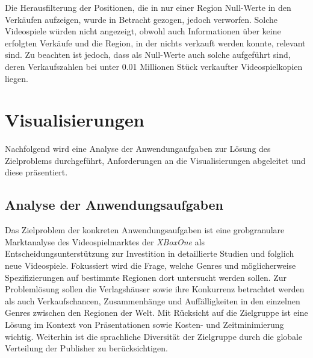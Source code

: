 \documentclass[usegeometry=true]{scrartcl}
\begin{document}
Die Herausfilterung der Positionen, die in nur einer Region Null-Werte in den Verkäufen aufzeigen, wurde in Betracht gezogen, jedoch verworfen.
Solche Videospiele würden nicht angezeigt, obwohl auch Informationen über keine erfolgten Verkäufe und die Region, in der nichts verkauft werden konnte, relevant sind. 
Zu beachten ist jedoch, dass als Null-Werte auch solche aufgeführt sind, deren Verkaufszahlen bei unter 0.01 Millionen Stück verkaufter Videospielkopien liegen. 

\section{Visualisierungen}
Nachfolgend wird eine Analyse der Anwendungaufgaben zur Lösung des Zielproblems durchgeführt, Anforderungen an die Visualisierungen abgeleitet und diese präsentiert.

\subsection{Analyse der Anwendungsaufgaben}
Das Zielproblem der konkreten Anwendungsaufgaben ist eine grobgranulare Marktanalyse des Videospielmarktes der \textit{XBoxOne} 
als Entscheidungsunterstützung zur Investition in detaillierte Studien und folglich neue Videospiele. 
Fokussiert wird die Frage, welche Genres und möglicherweise Spezifizierungen auf bestimmte Regionen dort untersucht werden sollen. 
Zur Problemlösung sollen die Verlagshäuser sowie ihre Konkurrenz betrachtet werden als auch Verkaufschancen, Zusammenhänge und Auffälligkeiten in den einzelnen Genres zwischen den Regionen der Welt. 
Mit Rücksicht auf die Zielgruppe ist eine Lösung im Kontext von Präsentationen sowie Kosten- und Zeitminimierung wichtig. 
Weiterhin ist die sprachliche Diversität der Zielgruppe durch die globale Verteilung der Publisher zu berücksichtigen.
\end{document}
